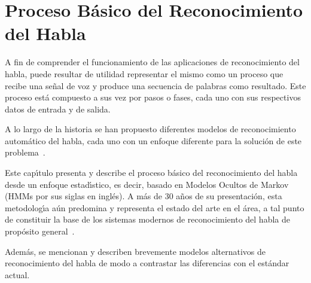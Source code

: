 \chapter{Proceso B\'{a}sico del Reconocimiento del Habla}
\label{sec:proceso}

A fin de comprender el funcionamiento de las aplicaciones de reconocimiento del habla, puede resultar de utilidad
representar el mismo como un proceso que recibe una se\~nal de voz y produce una secuencia de palabras como
resultado. Este proceso est\'a compuesto a sus vez por pasos o fases, cada uno con sus respectivos datos de entrada y 
de salida.

A lo largo de la historia se han propuesto diferentes modelos de reconocimiento autom\'atico del habla, cada uno
con un enfoque diferente para la soluci\'on de este \mbox{problema \cite{VimalaReview2012}}. 

Este cap{\'\i}tulo presenta y describe el proceso b\'asico del reconocimiento del habla desde un 
enfoque estad{\'\i}stico, es decir, basado en Modelos Ocultos de Markov (HMMs por sus siglas en ingl\'es). 
A m\'as de 30 a\~nos de su presentaci\'on, esta metodolog{\'\i}a a\'un predomina y representa el estado 
del arte en el \'area, a tal punto de constituir la base de los sistemas modernos de reconocimiento del habla 
de prop\'osito \mbox{general \cite{BakerResearch2009, VimalaReview2012}}.

Adem\'as, se mencionan y describen brevemente modelos alternativos de reconocimiento del habla de modo a contrastar
las diferencias con el est\'andar actual.



